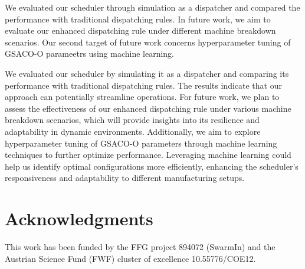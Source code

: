 \documentclass[runningheads]{llncs}
\begin{document}
We evaluated our scheduler through simulation as a dispatcher and compared the performance with traditional dispatching rules. In future work, we aim to evaluate our enhanced dispatching rule under different machine breakdown scenarios. 
Our second target of future work concerns hyperparameter tuning of GSACO-O parameetrs using machine learning.

We evaluated our scheduler by simulating it as a dispatcher and comparing its performance with traditional dispatching rules. The results indicate that our approach can potentially streamline operations. For future work, we plan to assess the effectiveness of our enhanced dispatching rule under various machine breakdown scenarios, which will provide insights into its resilience and adaptability in dynamic environments.
Additionally, we aim to explore hyperparameter tuning of GSACO-O parameters through machine learning techniques to further optimize performance. Leveraging machine learning could help us identify optimal configurations more efficiently, enhancing the scheduler's responsiveness and adaptability to different manufacturing setups.

\section*{Acknowledgments}
This work has been funded by the FFG project 894072 (SwarmIn) and
the Austrian Science Fund (FWF) cluster of excellence 10.55776/COE12.




%
%
%
% 
% 
%

\end{document}
